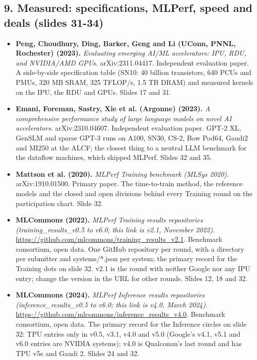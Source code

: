 \subsection*{9. Measured: specifications, MLPerf, speed and deals (slides 31-34)}
\begin{itemize}[leftmargin=1.2em,itemsep=3pt]\sloppy
\item \textbf{Peng, Choudhury, Ding, Barker, Geng and Li (UConn, PNNL, Rochester) (2023).} \textit{Evaluating emerging AI/ML accelerators: IPU, RDU, and NVIDIA/AMD GPUs}. arXiv:2311.04417. Independent evaluation paper. A side-by-side specification table (SN10: 40 billion transistors, 640 PCUs and PMUs, 320 MB SRAM, 325 TFLOP/s, 1.5 TB DRAM) and measured kernels on the IPU, the RDU and GPUs. Slides 17 and 31.
\item \textbf{Emani, Foreman, Sastry, Xie et al. (Argonne) (2023).} \textit{A comprehensive performance study of large language models on novel AI accelerators}. arXiv:2310.04607. Independent evaluation paper. GPT-2 XL, GenSLM and sparse GPT-3 runs on A100, SN30, CS-2, Bow Pod64, Gaudi2 and MI250 at the ALCF; the closest thing to a neutral LLM benchmark for the dataflow machines, which skipped MLPerf. Slides 32 and 35.
\item \textbf{Mattson et al. (2020).} \textit{MLPerf Training benchmark (MLSys 2020)}. arXiv:1910.01500. Primary paper. The time-to-train method, the reference models and the closed and open divisions behind every Training round on the participation chart. Slide 32.
\item \textbf{MLCommons (2022).} \textit{MLPerf Training results repositories (training\_results\_v0.5 to v6.0; this link is v2.1, November 2022)}. \url{https://github.com/mlcommons/training_results_v2.1}. Benchmark consortium, open data. One GitHub repository per round, with a directory per submitter and systems/*.json per system; the primary record for the Training dots on slide 32. v2.1 is the round with neither Google nor any IPU entry; change the version in the URL for other rounds. Slides 12, 18 and 32.
\item \textbf{MLCommons (2024).} \textit{MLPerf Inference results repositories (inference\_results\_v0.5 to v6.0; this link is v4.0, March 2024)}. \url{https://github.com/mlcommons/inference_results_v4.0}. Benchmark consortium, open data. The primary record for the Inference circles on slide 32: TPU entries only in v0.5, v3.1, v4.0 and v5.0 (Google's v4.1, v5.1 and v6.0 entries are NVIDIA systems); v4.0 is Qualcomm's last round and has TPU v5e and Gaudi 2. Slides 24 and 32.

\end{itemize}
